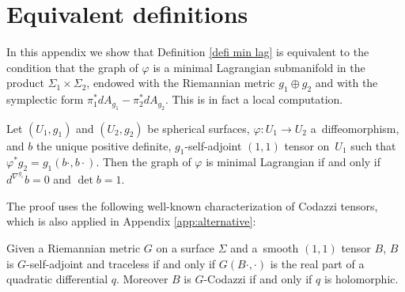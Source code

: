 \appendix

\section{Equivalent definitions}\label{app:defis}

In this appendix we show that Definition \ref{defi min lag} is equivalent to the condition that the graph of $\varphi$ is a minimal Lagrangian submanifold in the product $\Sigma_1\times\Sigma_2$, endowed with the Riemannian metric $g_1\oplus g_2$ and with the symplectic form $\pi_1^*dA_{g_1}-\pi_2^*dA_{g_2}$. This is in fact a local computation.

\begin{prop}\label{prop:app1}
Let $(U_1,g_1)$ and $(U_2,g_2)$ be spherical surfaces, $\varphi:U_1\to U_2$ a~diffeomorphism, and $b$ the unique positive definite, $g_1$-self-adjoint $(1,1)$ tensor on~$U_1$ such that $\varphi^*g_2=g_1(b\cdot,b\cdot)$. Then the graph of $\varphi$ is minimal Lagrangian if and only if $d^{\nabla^{g_1}}\!b=0$ and $\det b=1$.
\end{prop}

The proof uses the following well-known characterization of Codazzi tensors, which is also applied in Appendix \ref{app:alternative}:

\begin{prop} \label{prop hopf}
Given a Riemannian metric $G$ on a surface $\Sigma$ and a~smooth $(1,1)$ tensor $B$, $B$ is $G$-self-adjoint and traceless if and only if $G(B\cdot,\cdot)$ is the real part of a quadratic differential $q$. Moreover $B$ is $G$-Codazzi if and only if $q$ is holomorphic.
\end{prop}

